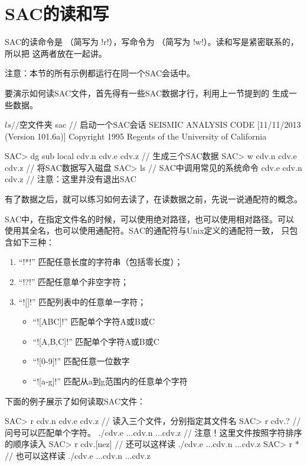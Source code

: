 \section{SAC的读和写}
\label{sec:read-and-write}
SAC的读命令是 （简写为 !r!），写命令为
（简写为 !w!）。读和写是紧密联系的，所以把
这两者放在一起讲。

注意：本节的所有示例都运行在同一个SAC会话中。

要演示如何读SAC文件，首先得有一些SAC数据才行，利用上一节提到的
 生成一些数据。
\begin{SACCode}
$ ls                // 空文件夹
$ sac               // 启动一个SAC会话
 SEISMIC ANALYSIS CODE [11/11/2013 (Version 101.6a)]
 Copyright 1995 Regents of the University of California

SAC> dg sub local cdv.n cdv.e cdv.z     // 生成三个SAC数据
SAC> w cdv.n cdv.e cdv.z                // 将SAC数据写入磁盘
SAC> ls                                 // SAC中调用常见的系统命令
cdv.e  cdv.n  cdv.z
                                        // 注意：这里并没有退出SAC
\end{SACCode}

有了数据之后，就可以练习如何去读了，在读数据之前，先说一说通配符的概念。

SAC中，在指定文件名的时候，可以使用绝对路径，也可以使用相对路径。可以
使用其全名，也可以使用通配符。SAC的通配符与Unix定义的通配符一致，
只包含如下三种：
\begin{enumerate}
\item ``!*!'' 匹配任意长度的字符串（包括零长度）；
\item ``!?!'' 匹配任意单个非空字符；
\item ``![]!'' 匹配列表中的任意单一字符；
    \begin{itemize}
        \item ``![ABC]!'' 匹配单个字符A或B或C
        \item ``![A,B,C]!'' 匹配单个字符A或B或C
        \item ``![0-9]!'' 匹配任意一位数字
        \item ``![a-g]!'' 匹配从a到g范围内的任意单个字符
    \end{itemize}
\end{enumerate}

下面的例子展示了如何读取SAC文件：
\begin{SACCode}
SAC> r cdv.n cdv.e cdv.z    // 读入三个文件，分别指定其文件名
SAC> r cdv.?                // 问号可以匹配单个字符。
./cdv.e ...cdv.n ...cdv.z   // 注意！这里文件按照字符排序的顺序读入
SAC> r cdv.[nez]            // 还可以这样读
./cdv.e ...cdv.n ...cdv.z
SAC> r *                    // 也可以这样读
./cdv.e ...cdv.n ...cdv.z
\end{SACCode}

